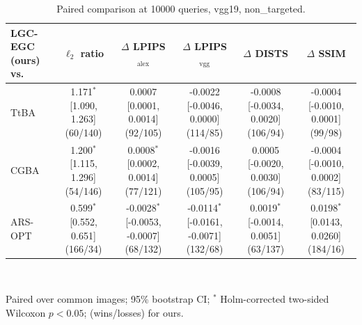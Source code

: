 \begin{table}[t]
\centering\footnotesize
\caption{Paired comparison at 10000 queries, vgg19, non\_targeted.}
\begin{tabular}{lccccc}
\toprule
LGC-EGC (ours) vs. & $\ell_2$ ratio & $\Delta$ LPIPS$_{\mathrm{alex}}$ & $\Delta$ LPIPS$_{\mathrm{vgg}}$ & $\Delta$ DISTS & $\Delta$ SSIM \\
\midrule
TtBA & 1.171$^{*}$ [1.090, 1.263] (60/140) & 0.0007 [0.0001, 0.0014] (92/105) & -0.0022 [-0.0046, 0.0000] (114/85) & -0.0008 [-0.0034, 0.0020] (106/94) & -0.0004 [-0.0010, 0.0001] (99/98) \\
CGBA & 1.200$^{*}$ [1.115, 1.296] (54/146) & 0.0008$^{*}$ [0.0002, 0.0014] (77/121) & -0.0016 [-0.0039, 0.0005] (105/95) & 0.0005 [-0.0020, 0.0030] (106/94) & -0.0004 [-0.0010, 0.0002] (83/115) \\
ARS-OPT & 0.599$^{*}$ [0.552, 0.651] (166/34) & -0.0028$^{*}$ [-0.0053, -0.0007] (68/132) & -0.0114$^{*}$ [-0.0161, -0.0071] (132/68) & 0.0019$^{*}$ [-0.0014, 0.0051] (63/137) & 0.0198$^{*}$ [0.0143, 0.0260] (184/16) \\
\bottomrule
\end{tabular}
\\[2pt]\parbox{\linewidth}{\scriptsize Paired over common images; 95\% bootstrap CI; $^{*}$ Holm-corrected two-sided Wilcoxon $p<0.05$; (wins/losses) for ours.}
\end{table}

